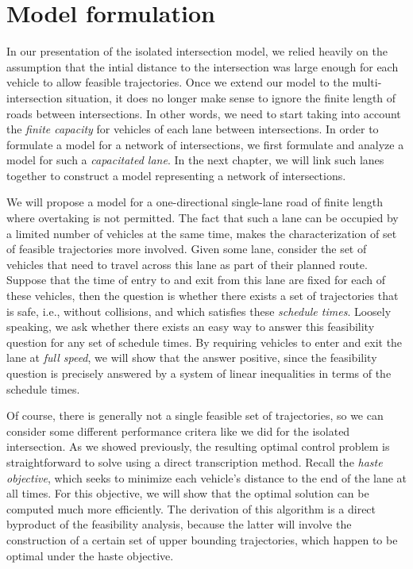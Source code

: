 \documentclass[a4paper]{report}
\theoremstyle{definition}
\theoremstyle{plain}
\begin{document}
\section{Model formulation}

In our presentation of the isolated intersection model, we relied heavily on the
assumption that the intial distance to the intersection was large enough for
each vehicle to allow feasible trajectories.
%
Once we extend our model to the multi-intersection situation, it does no longer
make sense to ignore the finite length of roads between intersections. In other
words, we need to start taking into account the \emph{finite capacity} for
vehicles of each lane between intersections.
%
In order to formulate a model for a network of intersections, we first formulate
and analyze a model for such a \emph{capacitated lane}.
%
In the next chapter, we will link such lanes together to construct a model
representing a network of intersections.

We will propose a model for a one-directional single-lane road of finite length
where overtaking is not permitted.
%
The fact that such a lane can be occupied by a limited number of vehicles at the
same time, makes the characterization of set of feasible trajectories more
involved.
%
Given some lane, consider the set of vehicles that need to travel across this
lane as part of their planned route. Suppose that the time of entry to and exit
from this lane are fixed for each of these vehicles, then the question is
whether there exists a set of trajectories that is safe, i.e., without
collisions, and which satisfies these \emph{schedule times}.
%
Loosely speaking, we ask whether there exists an easy way to answer this
feasibility question for any set of schedule times.
%
By requiring vehicles to enter and exit the lane at \emph{full speed}, we will show
that the answer positive, since the feasibility question is precisely answered
by a system of linear inequalities in terms of the schedule times.

Of course, there is generally not a single feasible set of trajectories, so we
can consider some different performance critera like we did for the isolated
intersection.
%
As we showed previously, the resulting optimal control problem is
straightforward to solve using a direct transcription method.
%
Recall the \emph{haste objective}, which seeks to minimize each vehicle's distance to
the end of the lane at all times. For this objective, we will show that the
optimal solution can be computed much more efficiently.
%
The derivation of this algorithm is a direct byproduct of the feasibility
analysis, because the latter will involve the construction of a certain set of
upper bounding trajectories, which happen to be optimal under the haste
objective.
\end{document}
